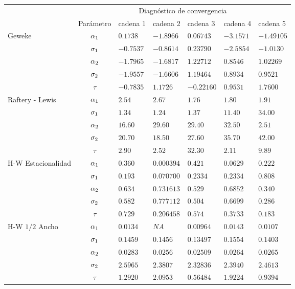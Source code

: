 \begin{table}[!h]
\centering
\begin{tabular}{|l|c|l|l|l|l|l|}
\hline
& \multicolumn{6}{|c|}{Diagnóstico de convergencia} \\
\cline{2-7}
& Parámetro & cadena 1  & cadena 2  & cadena 3 & cadena 4 & cadena 5	 \\
\hline \hline
\multirow{5}{2.5cm}{Geweke} & $\alpha_1$ & $0.1738$ & $-1.8966$ & $0.06743$ & $-3.1571$  & $-1.49105$\\ \cline{2-7}
& $\sigma_1$& $-0.7537$ & $-0.8614$ & $0.23790$ & $-2.5854$ & $ -1.0130 $\\
\cline{2-7}
& $\alpha_2$& $-1.7965$ & $-1.6817$ & $1.22712$ & $0.8546$ & $1.02269$\\
\cline{2-7}
& $\sigma_2$& $-1.9557$ & $-1.6606$ & $1.19464$ & $  0.8934$ & $ 0.9521$\\
\cline{2-7}
& $\tau $& $-0.7835   $ & $ 1.1726 $ & $-0.22160$ & $0.9531$ & $1.7600$\\
  \cline{1-7}
  \multirow{5}{2.5cm}{Raftery - Lewis} & $\alpha_1$ & $2.54$ & $2.67$ & $1.76  $ & $ 1.80$  & $  1.91 $\\ \cline{2-7}
& $\sigma_1$& $1.34  $ & $1.24 $ & $1.37$ & $11.40$ & $34.00$\\
\cline{2-7}
& $\alpha_2$ & $ 16.60 $ & $29.60  $ & $29.40 $ & $32.50$ & $ 2.51  $\\
\cline{2-7}
& $\sigma_2$& $20.70 $ & $ 18.50$  & $27.60$ & $35.70 $ & $42.00$\\
\cline{2-7}
& $\tau $& $2.90	$ & $ 2.52$ & $32.30$ & $ 2.11$ & $ 9.89$\\
  \cline{1-7}
  \multirow{5}{2.5cm}{H-W Estacionalidad} & $\alpha_1$ & $0.360$ & $0.000394 $ & $0.421$ & $0.0629$  & $0.222 $\\ \cline{2-7}
& $\sigma_1$& $0.193   $ & $0.070700  $ & $0.2334$ & $0.2334$ & $0.808 $\\
\cline{2-7}
& $\alpha_2$& $0.634 $ & $0.731613$ & $0.529$ & $0.6852$ & $0.340$\\
\cline{2-7}
& $\sigma_2$& $0.582 $ & $0.777112$ & $0.504$ & $ 0.6699$ & $0.286 $\\
\cline{2-7}
& $\tau$& $0.729 $ & $0.206458 $ & $0.574$ & $ 0.3733$ & $ 0.183$\\
  \cline{1-7}
  \multirow{5}{2.5cm}{H-W $1/2$ Ancho} & $\alpha_1$ & $0.0134$ & $NA $ & $0.00964$ & $0.0143 $  & $0.0107 $\\ \cline{2-7}
& $\sigma_1$& $0.1459 $ & $0.1456$ & $0.13497$ & $0.1554$ & $0.1403$\\
\cline{2-7}
& $\alpha_2$& $0.0283 $ & $0.0256$ & $0.02509$ & $0.0264$ & $0.0265$\\
\cline{2-7}
& $\sigma_2$& $2.5965$ & $2.3807$ & $2.32836$ & $ 2.3940$ & $2.4613$\\
\cline{2-7}
& $\tau$& $1.2920 $ & $2.0953$ & $0.56484 $ & $ 1.9224$ & $0.9394$\\
  \cline{1-7}


\end{tabular}
\end{table}

